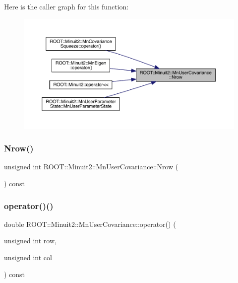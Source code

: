 Here is the caller graph for this function\+:
\nopagebreak
\begin{figure}[H]
\begin{center}
\leavevmode
\includegraphics[width=350pt]{d4/d72/classROOT_1_1Minuit2_1_1MnUserCovariance_a10adc07ae961afea4de48183aa68f6fc_icgraph}
\end{center}
\end{figure}
\mbox{\label{classROOT_1_1Minuit2_1_1MnUserCovariance_a10adc07ae961afea4de48183aa68f6fc}} 
\subsubsection{\texorpdfstring{Nrow()}{Nrow()}\hspace{0.1cm}{\footnotesize\ttfamily [3/3]}}
{\footnotesize\ttfamily unsigned int R\+O\+O\+T\+::\+Minuit2\+::\+Mn\+User\+Covariance\+::\+Nrow (\begin{DoxyParamCaption}{ }\end{DoxyParamCaption}) const\hspace{0.3cm}{\ttfamily [inline]}}

\mbox{\label{classROOT_1_1Minuit2_1_1MnUserCovariance_abc3ebb8eb0d31cb2cdf38fb16a4d8224}} 
\subsubsection{\texorpdfstring{operator()()}{operator()()}\hspace{0.1cm}{\footnotesize\ttfamily [1/6]}}
{\footnotesize\ttfamily double R\+O\+O\+T\+::\+Minuit2\+::\+Mn\+User\+Covariance\+::operator() (\begin{DoxyParamCaption}\item[{unsigned int}]{row,  }\item[{unsigned int}]{col }\end{DoxyParamCaption}) const\hspace{0.3cm}{\ttfamily [inline]}}

